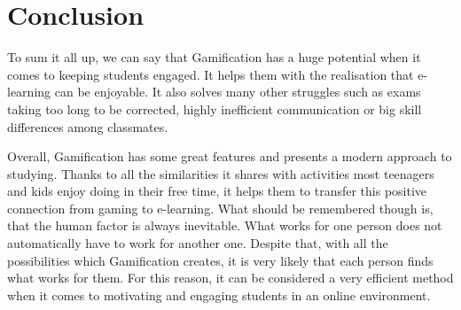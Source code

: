 \documentclass[10pt,english,a4paper]{article}
\begin{document}
\section{Conclusion} \label{section5}
	To sum it all up, we can say that Gamification has a huge potential when it comes to keeping students engaged. 
	It helps them with the realisation that e-learning can be enjoyable.
	It also solves many other struggles such as exams taking too long to be corrected, highly inefficient communication or big skill differences among classmates.
	
	Overall, Gamification has some great features and presents a modern approach to studying. 
	Thanks to all the similarities it shares with activities most teenagers and kids enjoy doing in their free time, it helps them to transfer this positive connection from gaming to e-learning. 
	What should be remembered though is, that the human factor is always inevitable. What works for one person does not automatically have to work for another one.
	Despite that, with all the possibilities which Gamification creates, it is very likely that each person finds what works for them. 
	For this reason, it can be considered a very efficient method when it comes to motivating and engaging students in an online environment.



\end{document}
